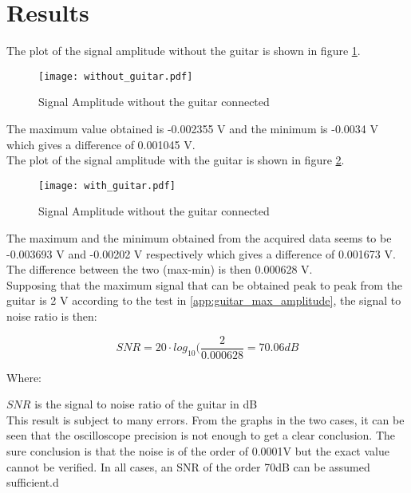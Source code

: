 \section{Results}

The plot of the signal amplitude without the guitar is shown in figure \ref{fig:without_guitar}. \\

\begin{figure}[hbt]
  \centering
  \texttt{[image: without\_guitar.pdf]}
  \caption{Signal Amplitude without the guitar connected}
  \label{fig:without_guitar}
\end{figure}

The maximum value obtained is -0.002355 V and the minimum is -0.0034 V which gives a difference of 0.001045 V. \\

The plot of the signal amplitude with the guitar is shown in figure \ref{fig:with_guitar}. \\

\begin{figure}[hbt]
  \centering
  \texttt{[image: with\_guitar.pdf]}
  \caption{Signal Amplitude without the guitar connected}
  \label{fig:with_guitar}
\end{figure}

The maximum and the minimum obtained from the acquired data seems to be -0.003693 V and -0.00202 V respectively which gives a difference of 0.001673 V.  \\
The difference between the two (max-min) is then 0.000628 V. \\
Supposing that the maximum signal that can be obtained peak to peak from the guitar is 2 V according to the test in \autoref{app:guitar_max_amplitude}, the signal to noise ratio is then:

\begin{equation}
	SNR = 20 \cdot log_{10}(\frac{2}{0.000628} = 70.06dB
	\end{equation}

Where:

$SNR$ is the signal to noise ratio of the guitar in dB \\


This result is subject to many errors. From the graphs in the two cases, it can be seen that the oscilloscope precision is not enough to get a clear conclusion. The sure conclusion is that the noise is of the order of 0.0001V but the exact value cannot be verified. In all cases, an SNR of the order 70dB can be assumed sufficient.d